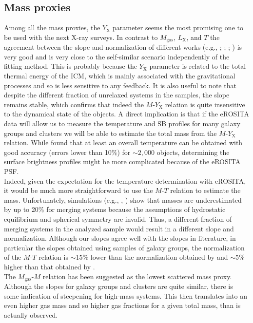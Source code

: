 \documentclass{aa} %
\begin{document}
\subsection{Mass proxies}
Among all the mass proxies, the $Y_{\text{X}}$ parameter seems the most
promising one to be used with the next X-ray surveys. In contrast to
$M_{\text{gas}}$, $L_{\text{X}}$, and $T$  the agreement between the slope and normalization of different works 
(e.g., \citealt{2007A&A...474L..37A}; \citealt{2007ApJ...668..772M};
\citealt{2009ApJ...692.1033V}; \citealt{2009ApJ...693.1142S}) is very
good and is very close to the self-similar scenario independently of the fitting method. This is probably because the $Y_{\text{X}}$ parameter is related to the total thermal energy of the ICM, which is mainly associated with the gravitational processes and so is less sensitive to any feedback. It is also
useful to note that despite the different fraction of unrelaxed
systems in the samples, the slope remains stable, which confirms that indeed
the $M$-$Y_{\text{X}}$ relation is quite insensitive to the dynamical
state of the objects. A direct implication is that if the eROSITA data will allow us to measure the temperature and SB profiles for many galaxy groups and clusters we will be able to
estimate the total mass from the $M$-$Y_{\text{X}}$ relation. While \citet{2014A&A...567A..65B}  found that at least an overall temperature can be obtained with  good accuracy (errors lower than 10$\%$) for $\sim2,000$ objects, determining the surface brightness profiles might be more complicated because of the eROSITA PSF. \\
Indeed, given the expectation for the temperature determination with
eROSITA, it would be much more straightforward to use the $M$-$T$
relation to estimate the mass. Unfortunately, simulations
(e.g., \citealt{1996ApJ...469..494E}, \citealt{2007ApJ...655...98N})
show that masses are underestimated by up to 20$\%$ for merging
systems because the assumptions of hydrostatic equilibrium and
spherical symmetry are invalid. Thus, a different fraction of merging
systems in the analyzed sample would result in a different slope and
normalization.  Although our slopes agree well with the slopes in
literature, in particular the slopes obtained using samples of galaxy
groups, the normalization of the $M$-$T$ relation is $\sim$15$\%$ lower
than the normalization obtained by \citet{2009ApJ...693.1142S} and $\sim$5$\%$
higher than that obtained by \citet{2011A&A...535A.105E}. \\
The $M_{\text{gas}}$-$M$ relation has been suggested as the lowest
scattered mass proxy. Although the slopes for galaxy groups and clusters are quite similar, there is some indication of steepening for high-mass systems. This then translates into an even higher gas mass and so higher gas fractions for a given total mass, than is actually
observed. \\
\end{document}
